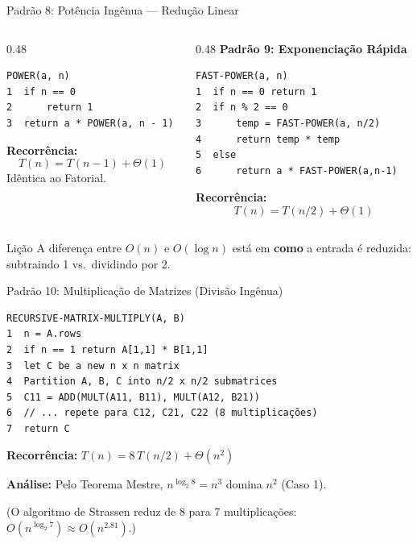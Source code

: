 \documentclass[aspectratio=169]{beamer}
\begin{document}
\begin{frame}{Padrão 8: Potência Ingênua --- Redução Linear}
    \begin{columns}[T]
    \begin{column}{0.48\textwidth}
\small
\begin{verbatim}
POWER(a, n)
1  if n == 0
2      return 1
3  return a * POWER(a, n - 1)
\end{verbatim}

        \textbf{Recorrência:}
        \[
            T(n) = T(n-1) + \Theta(1)
        \]
        Idêntica ao Fatorial.
        
        \hfill{}
    \end{column}
    \begin{column}{0.48\textwidth}
        \textbf{Padrão 9: Exponenciação Rápida}
\small
\begin{verbatim}
FAST-POWER(a, n)
1  if n == 0 return 1
2  if n % 2 == 0
3      temp = FAST-POWER(a, n/2)
4      return temp * temp
5  else
6      return a * FAST-POWER(a,n-1)
\end{verbatim}

        \textbf{Recorrência:}
        \[
            T(n) = T(n/2) + \Theta(1)
        \]
        \hfill{}
    \end{column}
    \end{columns}
    
    \vspace{0.3cm}
    \begin{alertblock}{Lição}
        A diferença entre $O(n)$ e $O(\log n)$ está em \textbf{como} a entrada é reduzida: subtraindo 1 vs.\ dividindo por 2.
    \end{alertblock}
\end{frame}

\begin{frame}{Padrão 10: Multiplicação de Matrizes (Divisão Ingênua)}
\begin{verbatim}
RECURSIVE-MATRIX-MULTIPLY(A, B)
1  n = A.rows
2  if n == 1 return A[1,1] * B[1,1]
3  let C be a new n x n matrix
4  Partition A, B, C into n/2 x n/2 submatrices
5  C11 = ADD(MULT(A11, B11), MULT(A12, B21))
6  // ... repete para C12, C21, C22 (8 multiplicações)
7  return C
\end{verbatim}
    \textbf{Recorrência:} $T(n) = 8\,T(n/2) + \Theta(n^2)$
    
    \vspace{0.2cm}
    \textbf{Análise:} Pelo Teorema Mestre, $n^{\log_2 8} = n^3$ domina $n^2$ (Caso 1).
    
    \vspace{0.1cm}
    \hfill{}
    
    \vspace{0.2cm}
    {\footnotesize (O algoritmo de Strassen reduz de 8 para 7 multiplicações: $O(n^{\log_2 7}) \approx O(n^{2.81})$.)}
\end{frame}
\end{document}
